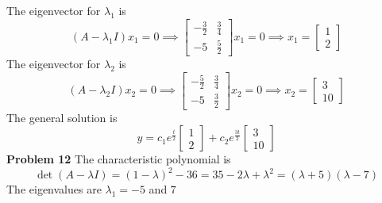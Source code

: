 The eigenvector for $\lambda_1$ is 
\[
    (A-\lambda_1 I)x_1 = 0
    \implies 
    \begin{bmatrix}
        -\frac{3}{2} & \frac{3}{4} \\
        -5 & \frac{5}{2}
    \end{bmatrix} x_1 = 0
    \implies x_1 = 
    \begin{bmatrix}
        1 \\ 2
    \end{bmatrix}
\]
The eigenvector for $\lambda_2$ is
\[
    (A-\lambda_2 I)x_2 = 0
    \implies 
    \begin{bmatrix}
        -\frac{5}{2} & \frac{3}{4} \\
        -5 & \frac{3}{2}
    \end{bmatrix} x_2 = 0
    \implies x_2 = 
    \begin{bmatrix}
        3 \\ 10
    \end{bmatrix}
\]
The general solution is 
\[
    y = c_1e^\frac{t}{2}\begin{bmatrix} 1 \\ 2 \end{bmatrix} + 
    c_2e^\frac{3t}{2} \begin{bmatrix} 3 \\ 10 \end{bmatrix}
\]
\textbf{Problem 12}
The characteristic polynomial is 
\[
    \det(A-\lambda I)
    = (1-\lambda)^2 - 36
    = 35 - 2\lambda + \lambda^2
    = (\lambda + 5)(\lambda - 7)
\]
The eigenvalues are $\lambda_1 = -5$ and $7$


